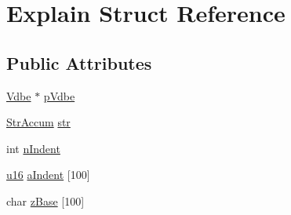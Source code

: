 \hypertarget{struct_explain}{\section{Explain Struct Reference}
\label{struct_explain}
}
\subsection*{Public Attributes}
\begin{DoxyCompactItemize}
\item 
\hyperlink{struct_vdbe}{Vdbe} $\ast$ \hyperlink{struct_explain_a5b40aff5e9132f568c01f5790c69cc89}{p\-Vdbe}
\item 
\hyperlink{struct_str_accum}{Str\-Accum} \hyperlink{struct_explain_af92c731731b19685b567d29493f1e83e}{str}
\item 
int \hyperlink{struct_explain_a5420e5a4c88050c6536328612fcad2b7}{n\-Indent}
\item 
\hyperlink{sqlite3_8c_a20f2299e322dcbde37cb07b16910b843}{u16} \hyperlink{struct_explain_ac80869acc619d982c3246134678b4d6e}{a\-Indent} \mbox{[}100\mbox{]}
\item 
char \hyperlink{struct_explain_a1ac782f9829311d6b85edc1707ef8d41}{z\-Base} \mbox{[}100\mbox{]}
\end{DoxyCompactItemize}


